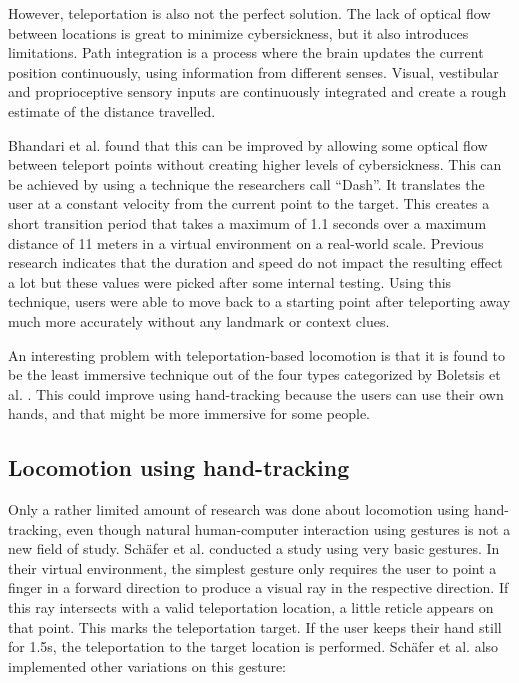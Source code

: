 However, teleportation is also not the perfect solution. 
The lack of optical flow between locations is great to minimize
cybersickness, but it also introduces limitations. 
Path integration is a process where the brain updates the current position
continuously, using information from different senses. Visual, vestibular
and proprioceptive sensory inputs are continuously integrated and create
a rough estimate of the distance travelled. \cite{Bhandari}

Bhandari et al. \cite{Bhandari} found that this can be improved by allowing some optical
flow between teleport points without creating higher levels of
cybersickness. This can be achieved by using a technique the researchers
call ``Dash''. It translates the user at a constant velocity from the
current point to the target. This creates a short transition period that
takes a maximum of 1.1 seconds over a maximum distance of 11 meters in a
virtual environment on a real-world scale. Previous research indicates
that the duration and speed do not impact the resulting effect a lot
\cite{Bowman} but these values were picked after some
internal testing. Using this technique, users were able to move back to
a starting point after teleporting away much more accurately without any
landmark or context clues. 

An interesting problem with teleportation-based locomotion is that it is
found to be the least immersive technique out of the four types
categorized by Boletsis et al. \cite{Boletsis}. This
could improve using hand-tracking because the users can use their own
hands, and that might be more immersive for some people. %


\subsection{Locomotion using hand-tracking}\label{locomotion-using-hand-tracking}

Only a rather limited amount of research was done about locomotion using hand-tracking, even though natural human-computer interaction using gestures is not a new field of study. Schäfer et al. \cite{Schafer2021} conducted a study using very basic gestures. In their virtual environment, the simplest gesture only requires the user to point a finger in a forward direction to produce a visual ray in the respective direction. If this ray intersects with a valid teleportation location, a little reticle appears on that point. This marks the teleportation target. If the user keeps their hand still for 1.5s, the teleportation to the target location is performed. Schäfer et al. also implemented other variations on this gesture:

